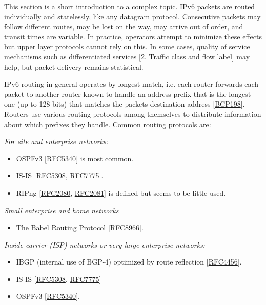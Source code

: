 \documentclass[
]{article}
\providecommand{\tightlist}{%
  \setlength{\itemsep}{0pt}\setlength{\parskip}{0pt}}
\begin{document}
This section is a short introduction to a complex topic. IPv6 packets
are routed individually and statelessly, like any datagram protocol.
Consecutive packets may follow different routes, may be lost on the way,
may arrive out of order, and transit times are variable. In practice,
operators attempt to minimize these effects but upper layer protocols
cannot rely on this. In some cases, quality of service mechanisms such
as differentiated services {[}\hyperref[traffic-class-and-flow-label]{2.
Traffic class and flow label}{]} may help, but packet delivery remains
statistical.

IPv6 routing in general operates by longest-match, i.e. each router
forwards each packet to another router known to handle an address prefix
that is the longest one (up to 128 bits) that matches the
packet\textquotesingle s destination address
{[}\href{https://www.rfc-editor.org/info/bcp198}{BCP198}{]}. Routers use
various routing protocols among themselves to distribute information
about which prefixes they handle. Common routing protocols are:

\emph{For site and enterprise networks:}

\begin{itemize}
\item
  OSPFv3 {[}\href{https://www.rfc-editor.org/info/rfc5340}{RFC5340}{]}
  is most common.
\item
  IS-IS {[}\href{https://www.rfc-editor.org/info/rfc5308}{RFC5308},
  \href{https://www.rfc-editor.org/info/rfc7775}{RFC7775}{]}.
\item
  RIPng {[}\href{https://www.rfc-editor.org/info/rfc2080}{RFC2080},
  \href{https://www.rfc-editor.org/info/rfc2081}{RFC2081}{]} is defined
  but seems to be little used.
\end{itemize}

\emph{Small enterprise and home networks}

\begin{itemize}
\tightlist
\item
  The Babel Routing Protocol
  {[}\href{https://www.rfc-editor.org/info/rfc8966}{RFC8966}{]}.
\end{itemize}

\emph{Inside carrier (ISP) networks or very large enterprise networks:}

\begin{itemize}
\item
  IBGP (internal use of BGP-4) optimized by route reflection
  {[}\href{https://www.rfc-editor.org/info/rfc4456}{RFC4456}{]}.
\item
  IS-IS {[}\href{https://www.rfc-editor.org/info/rfc5308}{RFC5308},
  \href{https://www.rfc-editor.org/info/rfc7775}{RFC7775}{]}
\item
  OSPFv3 {[}\href{https://www.rfc-editor.org/info/rfc5340}{RFC5340}{]}.
\end{itemize}
\end{document}
